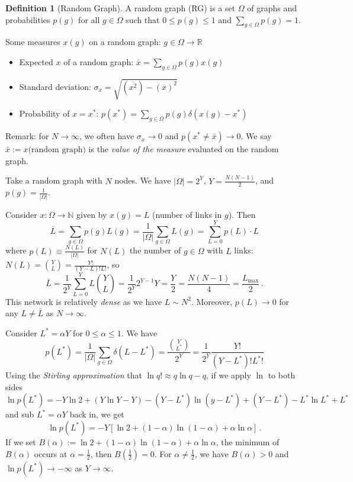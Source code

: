 \documentclass[12pt]{article}
\theoremstyle{definition}
\newtheorem{definition}{Definition}[section]
\begin{document}
\begin{definition}[Random Graph]
    A random graph (RG) is a set $\Omega$ of graphs and probabilities $p(g)$ for all $g\in\Omega$ such that $0\leq p(g)\leq 1$ and $\sum_{g\in\Omega}p(g)=1$. 
\end{definition}

Some measures $x(g)$ on a random graph: $g\in\Omega\rightarrow\mathbb{R}$
\begin{itemize}
    \item Expected $x$ of a random graph: $\bar{x}=\sum_{g\in\Omega}p(g)x(g)$
    \item Standard deviation: $\sigma_x=\sqrt{(\overline{x^2}) - (\overline{x})^2}$
    \item Probability of $x=x^*$: $p(x^*)=\sum_{g\in\Omega} p(g)\delta(x(g)-x^*)$
\end{itemize}
Remark: for $N\rightarrow\infty$, we often have $\sigma_x\rightarrow 0$ and $p(x^*\neq\bar{x})\rightarrow 0$.  We say $\bar x := x(\text{random graph)}$ is the \textit{value of the measure} evaluated on the random graph.

Take a random graph with $N$ nodes. We have $|\Omega|=2^Y$, $Y=\frac{N(N-1)}{2}$, and $p(g)=\frac{1}{|\Omega|}$. 

Consider $x \colon \Omega \to \mathbb N$ given by $x(g) = L$ (number of links in $g$). Then
\[
\bar{L}=\sum_{g\in\Omega}p(g)L(g)=\frac{1}{|\Omega|}\sum_{g\in \Omega}L(g)=\sum_{L=0}^Yp(L)\cdot L
\]
where $p(L)\equiv\frac{N(L)}{|\Omega|}$ for $N(L)$ the number of $g\in\Omega$ with $L$ links: $N(L)=\binom{Y}{L}=\frac{Y!}{(Y-L)!L!}$, so 
\[
\bar{L} = \frac{1}{2^Y}\sum_{L=0}^Y L\binom{Y}{L}=\frac{1}{2^Y}2^{Y-1}Y=\frac{Y}{2}=\frac{N(N-1)}{4}=\frac{L_{\max}}{2}\,.
\]
This network is relatively \textit{dense} as we have $L\sim N^2$. Moreover, $p(L)\rightarrow 0$ for any $L\neq\bar{L}$ as $N\rightarrow\infty$. 


Consider $L^*=\alpha Y$ for $0\leq\alpha\leq 1$. We have
\[
p(L^*)=\frac{1}{|\Omega|}\sum_{g\in\Omega}\delta(L-L^*) = \frac{\binom{Y}{L^*}}{2^Y} = \frac{1}{2^Y}\frac{Y!}{(Y-L^*)!L^*!}
\]
Using the \textit{Stirling approximation} that $\ln q!\approx q\ln q - q$, if we apply $\ln$ to both sides
\begin{equation}
    \ln p(L^*) = -Y\ln 2 + (Y\ln Y - Y) - (Y-L^*)\ln(y-L^*) + (Y-L^*)  -L^*\ln L^*+L^*
\end{equation}
and sub $L^* = \alpha Y$ back in, we get
\[
\ln p(L^*) = -Y[\ln 2 + (1-\alpha)\ln (1-\alpha) + \alpha\ln \alpha]\,.
\]
If we set $B(\alpha) := \ln 2 + (1-\alpha)\ln (1-\alpha) + \alpha\ln \alpha$, the minimum of $B(\alpha)$ occurs at $\alpha = \frac{1}{2}$, then $B(\frac{1}{2})=0$. For $\alpha\neq \frac{1}{2}$, we have $B(\alpha)>0$ and $\ln p(L^*) \to -\infty$ as $Y\to \infty$.
\end{document}
